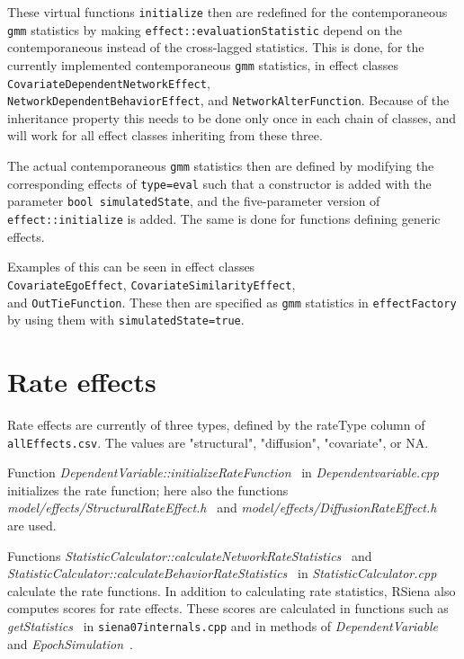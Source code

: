 \documentclass[a4paper,12pt,fleqn]{article}
\newcommand{\nnm}[1]{\textsf{\small\textit{#1}\ }}
\begin{document}
These virtual functions \texttt{initialize} then are redefined for
the contemporaneous \texttt{gmm}
statistics by making \texttt{effect::evaluationStatistic} depend
on the contemporaneous instead of the cross-lagged statistics.
This is done, for the currently implemented contemporaneous \texttt{gmm}
statistics, in effect classes \texttt{CovariateDependentNetworkEffect},\\
\texttt{NetworkDependentBehaviorEffect}, and
\texttt{NetworkAlterFunction}.
Because of the inheritance property this needs to be done only once
in each chain of classes, and will work for all effect classes inheriting
from these three.

The actual contemporaneous \texttt{gmm} statistics then are defined
by modifying the corresponding effects of \texttt{type=eval}
such that a constructor is added with the parameter \texttt{bool simulatedState},
and the five-parameter version of  \texttt{effect::initialize} is added.
The same is done for functions defining generic effects.

Examples of this can be seen in effect classes \\
\texttt{CovariateEgoEffect}, \texttt{CovariateSimilarityEffect},\\
and \texttt{OutTieFunction}.
These then are specified as \texttt{gmm} statistics in
\texttt{effectFactory} by using them with \texttt{simulatedState=true}.

\newpage
\section{Rate effects}

Rate effects are currently of three types,
defined by the rateType column of  \texttt{allEffects.csv}.
The values are "structural", "diffusion", "covariate", or NA.

Function  \nnm{DependentVariable::initializeRateFunction}
in  \nnm{Dependentvariable.cpp}
initializes the rate function; here also the functions\\
 \nnm{model/effects/StructuralRateEffect.h} and
 \nnm{model/effects/DiffusionRateEffect.h}
are used.

Functions \nnm{StatisticCalculator::calculateNetworkRateStatistics} and
\nnm{StatisticCalculator::calculateBehaviorRateStatistics}
in \nnm{StatisticCalculator.cpp}
calculate the rate functions. In addition to calculating rate statistics,
RSiena also computes scores for rate effects. These scores are calculated in
functions such as \nnm{getStatistics} in \texttt{siena07internals.cpp} and in
methods of \nnm{DependentVariable} and \nnm{EpochSimulation}.
\end{document}
